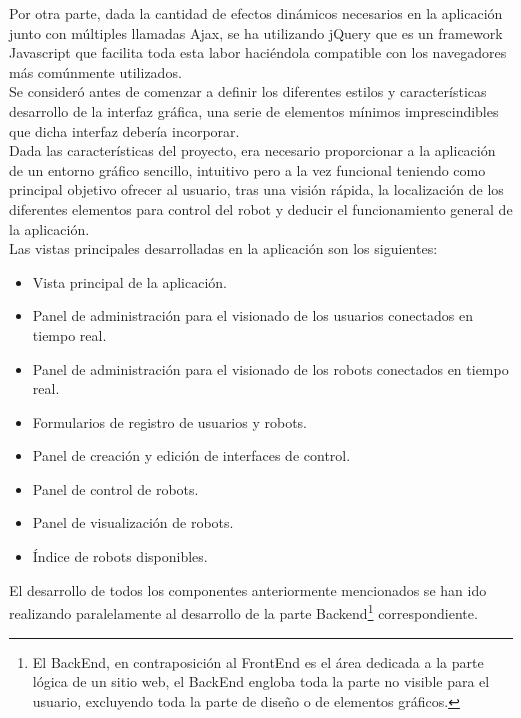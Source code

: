 Por otra parte, dada la cantidad de efectos dinámicos necesarios en la aplicación junto con múltiples llamadas Ajax, se ha utilizando jQuery que es un framework Javascript que facilita toda esta
labor haciéndola compatible con los navegadores más comúnmente utilizados.\\

Se consideró antes de comenzar a definir los diferentes estilos y características desarrollo de la interfaz gráfica, una serie de elementos mínimos imprescindibles que dicha interfaz debería incorporar.\\

Dada las características del proyecto, era necesario proporcionar a la aplicación de un entorno gráfico sencillo, intuitivo pero a la vez funcional teniendo como principal objetivo ofrecer al usuario, tras 
una visión rápida, la localización de los diferentes elementos para control del robot y deducir el funcionamiento general de la aplicación.\\

Las vistas principales desarrolladas en la aplicación son los siguientes:

\begin{itemize}
 \item Vista principal de la aplicación.
 \item Panel de administración para el visionado de los usuarios conectados en tiempo real.
 \item Panel de administración para el visionado de los robots conectados en tiempo real.
 \item Formularios de registro de usuarios y robots.
 \item Panel de creación y edición de interfaces de control.
 \item Panel de control de robots.
 \item Panel de visualización de robots.
 \item Índice de robots disponibles.
\end{itemize}


El desarrollo de todos los componentes anteriormente mencionados se han ido realizando paralelamente al desarrollo de la parte Backend\footnote{El BackEnd, en contraposición al FrontEnd
es el área dedicada a la parte lógica de un sitio web, el BackEnd engloba toda la parte no visible para el usuario, excluyendo toda la parte de diseño o de elementos gráficos.} correspondiente.\\
